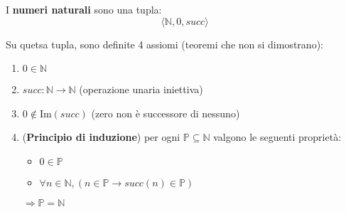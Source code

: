 \documentclass[a4paper, 12pt]{book}
\begin{document}
    \begin{tcolorbox}[
      colback=cyan!5!white,
      colframe=blue!50!black,
      title=\textbf{Definizione - numeri naturali},
      coltitle=white,
      fonttitle=\bfseries,
      arc=3mm,
      boxrule=0.5pt,
      enhanced,
      breakable
    ]
      I \textbf{numeri naturali} sono una tupla:
      \begin{equation*}
        \langle \mathbb{N}, 0, succ \rangle
      \end{equation*}

      Su quetsa tupla, sono definite 4 assiomi (teoremi che non si dimostrano):
      \begin{enumerate}
        \item $0 \in \mathbb{N}$
        \item $succ: \mathbb{N} \rightarrow \mathbb{N}$ (operazione unaria iniettiva)
        \item $0 \notin \mathrm{Im}(succ)$ (zero non è successore di nessuno)
        \item (\textbf{Principio di induzione}) per ogni $\mathbb{P} \subseteq \mathbb{N}$ valgono le seguenti proprietà:
        \begin{itemize}
          \item $0 \in \mathbb{P}$
          \item $\forall n \in \mathbb{N}, (n \in \mathbb{P} \rightarrow succ(n) \in \mathbb{P})$
        \end{itemize}
        $\Rightarrow \mathbb{P} = \mathbb{N}$
      \end{enumerate}
    \end{tcolorbox}
\end{document}

